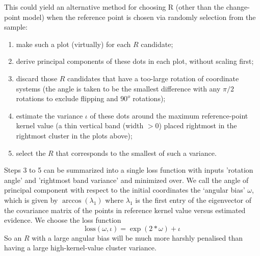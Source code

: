 \documentclass[%
 reprint,
 amsmath,amssymb,
 aps,
]{revtex4-2}
\begin{document}
This could yield an alternative method for choosing R (other than the change-point model) when the reference point is chosen via randomly selection from the sample:
\begin{enumerate}
    \item make such a plot (virtually) for each $R$ candidate;
    \item derive principal components of these dots in each plot, without scaling first;
    \item discard those $R$ candidates that have a too-large rotation of coordinate systems (the angle is taken to be the smallest difference with any $\pi/2$ rotations to exclude flipping and $90^o$ rotations);
    \item estimate the variance $\iota$ of these dots around the maximum reference-point kernel value (a thin vertical band (width $> 0$) placed rightmost in the rightmost cluster in the plots above);
    \item select the $R$ that corresponds to the smallest of such a variance.
\end{enumerate}
Steps 3 to 5 can be summarized into a single loss function with inputs 'rotation angle' and 'rightmost band variance' and minimized over. We call the angle of principal component with respect to the initial coordinates the `angular bias' $\omega$, which is given by $\arccos(\lambda_1)$ where $\lambda_1$ is the first entry of the eigenvector of the covariance matrix of the points in reference kernel value versus estimated evidence. We choose the loss function
\begin{equation*}
    \text{loss}(\omega, \iota) = \exp(2 * \omega) + \iota
\end{equation*}
So an $R$ with a large angular bias will be much more harshly penalised than having a large high-kernel-value cluster variance.


\end{document}
